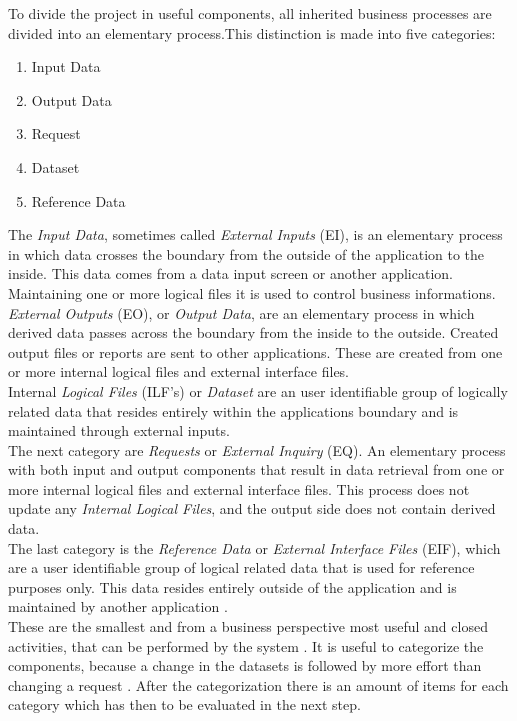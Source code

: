 To divide the project in useful components, all inherited business processes are divided into an elementary process.This distinction is made into five categories:
\begin{enumerate}
	\item Input Data
	\item Output Data
	\item Request
	\item Dataset
	\item Reference Data
\end{enumerate}
The \textit{Input Data}, sometimes called \textit{External Inputs} (EI), is an elementary process in which data crosses the boundary from the outside of the application to the inside. This data comes from a data input screen or another application. Maintaining one or more logical files it is used to control business informations.\\
\textit{External Outputs} (EO), or \textit{Output Data}, are an elementary process in which derived data passes across the boundary from the inside to the outside. Created output files or reports are sent to other applications. These are created from one or more internal logical files and external interface files.\\
Internal \textit{Logical Files} (ILF’s) or \textit{Dataset} are an user identifiable group of logically related data that resides entirely within the applications boundary and is maintained through external inputs.\\
The next category are \textit{Requests} or \textit{External Inquiry} (EQ). An elementary process with both input and output components that result in data retrieval from one or more internal logical files and external interface files. This process does not update any \textit{Internal Logical Files}, and the output side does not contain derived data.\\
The last category is the \textit{Reference Data} or \textit{External Interface Files} (EIF), which are a user identifiable group of logical related data that is used for reference purposes only. This data resides entirely outside of the application and is maintained by another application \cite{fpafundamentals}.\\
These are the smallest and from a business perspective most useful and closed activities, that can be performed by the system \cite{FPKompakt}. It is useful to categorize the components, because a change in the datasets is followed by more effort than changing a request \cite{itplanung}. After the categorization there is an amount of items for each category which has then to be evaluated in the next step.

